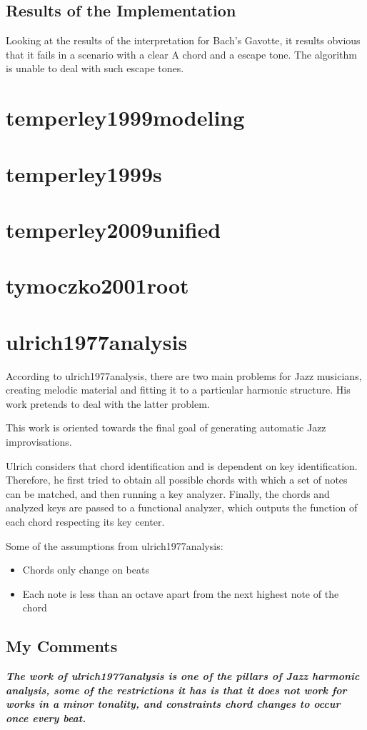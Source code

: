   \subsection{Results of the Implementation}
  Looking at the results of the interpretation for Bach's Gavotte, it results obvious that it fails in a scenario with a clear A chord and a escape tone. The algorithm is unable to deal with such escape tones.
\section{temperley1999modeling }
\section{temperley1999s }
\section{temperley2009unified }
\section{tymoczko2001root }
\section{ulrich1977analysis }
  According to ulrich1977analysis, there are two main problems for Jazz musicians, creating melodic material and fitting it to a particular harmonic structure. His work pretends to deal with the latter problem.

  This work is oriented towards the final goal of generating automatic Jazz improvisations.

  Ulrich considers that chord identification and is dependent on key identification. Therefore, he first tried to obtain all possible chords with which a set of notes can be matched, and then running a key analyzer. Finally, the chords and analyzed keys are passed to a functional analyzer, which outputs the function of each chord respecting its key center.

  Some of the assumptions from ulrich1977analysis:
  \begin{itemize}
    \item Chords only change on beats
    \item Each note is less than an octave apart from the next highest note of the chord
  \end{itemize}

  \subsection{My Comments}
    \emph{\textbf{
      The work of ulrich1977analysis is one of the pillars of Jazz harmonic analysis, some of the restrictions it has is that it does not work for works in a minor tonality, and constraints chord changes to occur once every beat.
    }}
